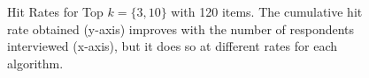 \documentclass[a4paper,12pt]{article}
\newcommand{\eric}[1]{\textcolor{red}{\textbf{(eric)} #1}}
\newcommand{\fixedexpress}{\textbf{express}}
\newcommand{\ts}{\textbf{TS} }
\newcommand{\edts}{$\epsilon$-$\delta$-\textbf{diffuse TS} }
\newcommand{\tsthres}{\textbf{TS-thres} }
\newcommand{\edtsthres}{$\epsilon$-$\delta$-\textbf{TS-thres} }
\begin{document}
\begin{figure}%
    \caption{Hit Rates for Top $k=\{3,10\}$ with 120 items. The cumulative hit rate obtained (y-axis) improves with the number of respondents interviewed (x-axis), but it does so at different rates for each algorithm.}%
    \label{fig:K120_L20_k3hit_k10hit}%
 	\begin{center}
    \qquad
	\end{center}
\end{figure}

\end{document}
